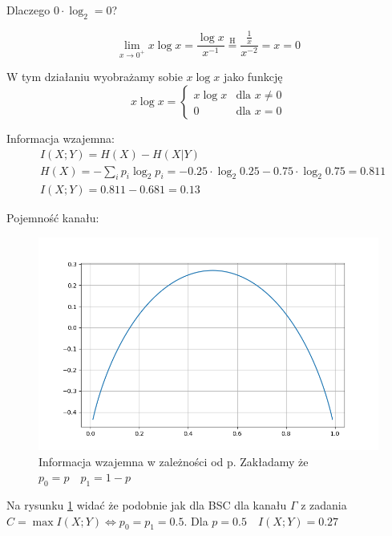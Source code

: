 \documentclass[12pt]{article}
\begin{document}
Dlaczego $0 \cdot \log_2 =0 $?

$$ 
\lim_{x\to 0^+} x \log x=\frac{\log x}{x^{-1}}  \overset{\mathrm{H}}{=} \frac{\frac{1}{x}}{x^{-2}}=x = 0
$$

W tym działaniu wyobrażamy sobie $x\log x$ jako funkcję 
$$ 
x\log x = 
\begin{cases}
    x\log x &  \text{dla }   x \ne 0 \\
    0      &  \text{dla }   x = 0
\end{cases}
$$

Informacja wzajemna: 
\begin{align*}
    & I(X;Y) = H(X) - H(X|Y) \\
    & H(X) =- \sum_i p_i \log_2 p_i = -0.25\cdot \log_2 0.25 - 0.75 \cdot \log_2 0.75 = 0.811 \\
    & I(X;Y) = 0.811 - 0.681 = 0.13
\end{align*}

Pojemność kanału:

\begin{figure}[h]
    \includegraphics[width=14cm]{infromacja_wzajemna.png}
    \caption{Informacja wzajemna w zależności od p. Zakładamy że $p_0=p \quad p_1 = 1-p$}
    \label{img:mut_inf}
\end{figure}

Na rysunku \ref{img:mut_inf} widać że podobnie jak dla BSC dla kanału $\Gamma$ z zadania $C= \max I(X;Y) \iff p_0=p_1=0.5$.
Dla $p=0.5 \quad I(X;Y) = 0.27 $
\end{document}
